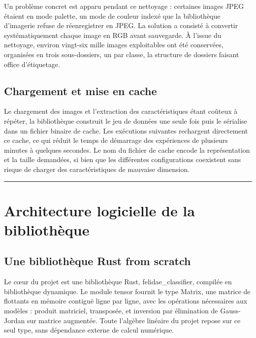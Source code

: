 \documentclass[11pt,a4paper]{report}
\begin{document}
Un problème concret est apparu pendant ce nettoyage : certaines images
JPEG étaient en mode palette, un mode de couleur indexé que la
bibliothèque d'imagerie refuse de réenregistrer en JPEG. La solution a
consisté à convertir systématiquement chaque image en RGB avant
sauvegarde. À l'issue du nettoyage, environ vingt-six mille images
exploitables ont été conservées, organisées en trois sous-dossiers, un
par classe, la structure de dossiers faisant office d'étiquetage.

\hypertarget{chargement-et-mise-en-cache}{%
\section{Chargement et mise en
cache}\label{chargement-et-mise-en-cache}}

Le chargement des images et l'extraction des caractéristiques étant
coûteux à répéter, la bibliothèque construit le jeu de données une seule
fois puis le sérialise dans un fichier binaire de cache. Les exécutions
suivantes rechargent directement ce cache, ce qui réduit le temps de
démarrage des expériences de plusieurs minutes à quelques secondes. Le
nom du fichier de cache encode la représentation et la taille demandées,
si bien que les différentes configurations coexistent sans risque de
charger des caractéristiques de mauvaise dimension.

\begin{center}\rule{0.5\linewidth}{0.5pt}\end{center}

\hypertarget{architecture-logicielle-de-la-bibliothuxe8que}{%
\chapter{Architecture logicielle de la
bibliothèque}\label{architecture-logicielle-de-la-bibliothuxe8que}}

\hypertarget{une-bibliothuxe8que-rust-from-scratch}{%
\section{Une bibliothèque Rust from
scratch}\label{une-bibliothuxe8que-rust-from-scratch}}

Le cœur du projet est une bibliothèque Rust, felidae\_classifier,
compilée en bibliothèque dynamique. Le module tensor fournit le type
Matrix, une matrice de flottants en mémoire contiguë ligne par ligne,
avec les opérations nécessaires aux modèles : produit matriciel,
transposée, et inversion par élimination de Gauss-Jordan sur matrice
augmentée. Toute l'algèbre linéaire du projet repose sur ce seul type,
sans dépendance externe de calcul numérique.
\end{document}
